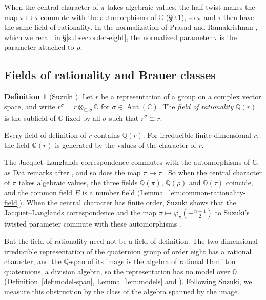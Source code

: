 \documentclass[a4paper,11pt]{amsart}
\theoremstyle{definition}
\newtheorem{definition}[theorem]{Definition}
\theoremstyle{remark}
\numberwithin{equation}{section}
\newcommand{\Q}{\mathbb{Q}}
\DeclareMathOperator{\Aut}{Aut}
\newcommand{\C}{\mathbb{C}}
\begin{document}
When the central character of $\pi$ takes algebraic values, the half twist makes the map $\pi\mapsto\tau$ commute with the automorphisms of $\C$ (\S\ref{subsec:intro-classes}), so $\pi$ and $\tau$ then have the same field of rationality. In the normalization of Prasad and Ramakrishnan \cite[\S6]{PR12}, which we recall in \S\ref{subsec:order-eight}, the normalized parameter $\tau$ is the parameter attached to $\rho$.

\subsection{Fields of rationality and Brauer classes}\label{subsec:intro-classes}

\begin{definition}[Suzuki {\cite[Definition~3.0.1]{Su23}}]\label{def:rationality} Let $r$ be a representation of a group on a complex vector space, and write $r^\sigma=r\otimes_{\C,\sigma}\C$ for $\sigma\in\Aut(\C)$. The \emph{field of rationality} $\Q(r)$ is the subfield of $\C$ fixed by all $\sigma$ such that $r^\sigma\cong r$.
\end{definition}

Every field of definition of $r$ contains $\Q(r)$. For irreducible finite-dimensional $r$, the field $\Q(r)$ is generated by the values of the character of $r$.

The Jacquet--Langlands correspondence commutes with the automorphisms of $\C$, as Dat remarks after \cite[Th\'eor\`eme~2.1.2]{Dat07}, and so does the map $\pi\mapsto\tau$ \cite[Fait~2.2.3]{Dat07}. So when the central character of $\pi$ takes algebraic values, the three fields $\Q(\pi)$, $\Q(\rho)$ and $\Q(\tau)$ coincide, and the common field $E$ is a number field (Lemma~\ref{lem:common-rationality-field}). When the central character has finite order, Suzuki shows that the Jacquet--Langlands correspondence and the map $\pi\mapsto\varphi_\pi(-\frac{n-1}2)$ to Suzuki's twisted parameter commute with these automorphisms \cite[Lemma~4.0.3]{Su23}.

But the field of rationality need not be a field of definition. The two-dimensional irreducible representation of the quaternion group of order eight has a rational character, and the $\Q$-span of its image is the algebra of rational Hamilton quaternions, a division algebra, so the representation has no model over $\Q$ (Definition~\ref{def:model-span}, Lemma~\ref{lem:models} and \cite[Remarks~3.0.4 and~3.0.10]{Su23}). Following Suzuki, we measure this obstruction by the class of the algebra spanned by the image.
\end{document}
